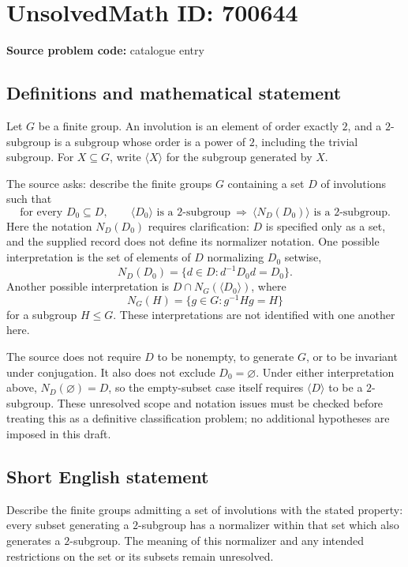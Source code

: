 \documentclass[11pt]{article}
\begin{document}
\section*{UnsolvedMath ID: 700644}
\textbf{Source problem code:} catalogue entry
\subsection{Definitions and mathematical statement}
Let \(G\) be a finite group. An involution is an element of order exactly \(2\), and a \(2\)-subgroup is a subgroup whose order is a power of \(2\), including the trivial subgroup. For \(X\subseteq G\), write \(\langle X\rangle\) for the subgroup generated by \(X\).

The source asks: describe the finite groups \(G\) containing a set \(D\) of involutions such that
\[
\text{for every }D_0\subseteq D,\qquad
\langle D_0\rangle\text{ is a }2\text{-subgroup}
\ \Longrightarrow\ 
\langle N_D(D_0)\rangle\text{ is a }2\text{-subgroup}.
\]
Here the notation \(N_D(D_0)\) requires clarification: \(D\) is specified only as a set, and the supplied record does not define its normalizer notation. One possible interpretation is the set of elements of \(D\) normalizing \(D_0\) setwise,
\[
N_D(D_0)=\{d\in D:d^{-1}D_0d=D_0\}.
\]
Another possible interpretation is \(D\cap N_G(\langle D_0\rangle)\), where
\[
N_G(H)=\{g\in G:g^{-1}Hg=H\}
\]
for a subgroup \(H\leq G\). These interpretations are not identified with one another here.

The source does not require \(D\) to be nonempty, to generate \(G\), or to be invariant under conjugation. It also does not exclude \(D_0=\varnothing\). Under either interpretation above, \(N_D(\varnothing)=D\), so the empty-subset case itself requires \(\langle D\rangle\) to be a \(2\)-subgroup. These unresolved scope and notation issues must be checked before treating this as a definitive classification problem; no additional hypotheses are imposed in this draft.
\subsection{Short English statement}
Describe the finite groups admitting a set of involutions with the stated property: every subset generating a \(2\)-subgroup has a normalizer within that set which also generates a \(2\)-subgroup. The meaning of this normalizer and any intended restrictions on the set or its subsets remain unresolved.
\end{document}
